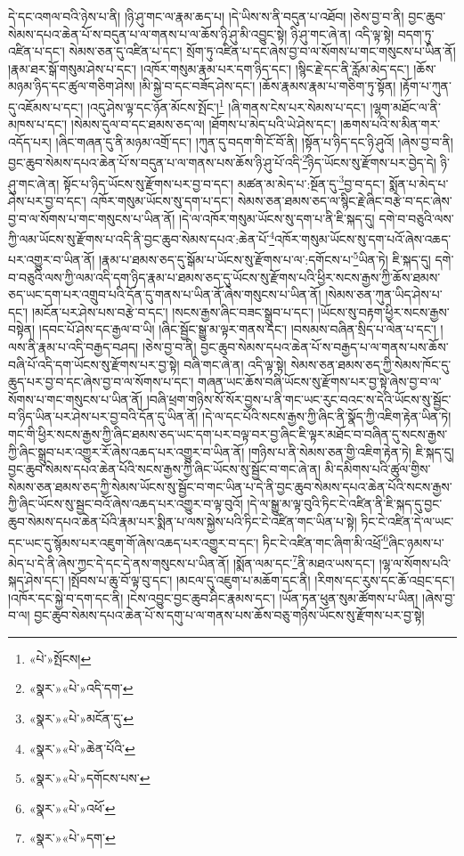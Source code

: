 དེ་དང་འགལ་བའི་ཉེས་པ་ནི། །ཉི་ཤུ་གང་ལ་རྣམ་ཆད་པ། །དེ་ཡིས་ས་ནི་བདུན་པ་འཐོབ། །ཅེས་བྱ་བ་ནི། བྱང་ཆུབ་སེམས་དཔའ་ཆེན་པོ་ས་བདུན་པ་ལ་གནས་པ་ལ་ཆོས་ཉི་ཤུ་མི་འབྱུང་སྟེ། ཉི་ཤུ་གང་ཞེ་ན། འདི་ལྟ་སྟེ། བདག་ཏུ་འཛིན་པ་དང་། སེམས་ཅན་དུ་འཛིན་པ་དང་། སྲོག་ཏུ་འཛིན་པ་དང་ཞེས་བྱ་བ་ལ་སོགས་པ་གང་གསུངས་པ་ཡིན་ནོ། །རྣམ་ཐར་སྒོ་གསུམ་ཤེས་པ་དང་། །འཁོར་གསུམ་རྣམ་པར་དག་ཉིད་དང་། །སྙིང་རྗེ་དང་ནི་རློམ་མེད་དང་། །ཆོས་མཉམ་ཉིད་དང་ཚུལ་གཅིག་ཤེས། །མི་སྐྱེ་བ་དང་བཟོད་ཤེས་དང་། །ཆོས་རྣམས་རྣམ་པ་གཅིག་ཏུ་སྟོན། །རྟོག་པ་ཀུན་དུ་འཇོམས་པ་དང་། །འདུ་ཤེས་ལྟ་དང་ཉོན་མོངས་སྤོང་།\footnote{«པེ་»སྤོངས།} །ཞི་གནས་ངེས་པར་སེམས་པ་དང་། །ལྷག་མཐོང་ལ་ནི་མཁས་པ་དང་། །སེམས་དུལ་བ་དང་ཐམས་ཅད་ལ། །ཐོགས་པ་མེད་པའི་ཡེ་ཤེས་དང་། །ཆགས་པའི་ས་མིན་གར་འདོད་པར། །ཞིང་གཞན་དུ་ནི་མཉམ་འགྲོ་དང་། །ཀུན་དུ་བདག་གི་ངོ་བོ་ནི། །སྟོན་པ་ཉིད་དང་ཉི་ཤུའོ། །ཞེས་བྱ་བ་ནི། བྱང་ཆུབ་སེམས་དཔའ་ཆེན་པོ་ས་བདུན་པ་ལ་གནས་པས་ཆོས་ཉི་ཤུ་པོ་འདི་\footnote{«སྣར་»«པེ་»འདི་དག་}ཉིད་ཡོངས་སུ་རྫོགས་པར་བྱེད་དེ། ཉི་ཤུ་གང་ཞེ་ན། སྟོང་པ་ཉིད་ཡོངས་སུ་རྫོགས་པར་བྱ་བ་དང་། མཚན་མ་མེད་པ་:སྔོན་དུ་\footnote{«སྣར་»«པེ་»མངོན་དུ་}བྱ་བ་དང་། སྨོན་པ་མེད་པ་ཤེས་པར་བྱ་བ་དང་། འཁོར་གསུམ་ཡོངས་སུ་དག་པ་དང་། སེམས་ཅན་ཐམས་ཅད་ལ་སྙིང་རྗེ་ཞིང་བརྩེ་བ་དང་ཞེས་བྱ་བ་ལ་སོགས་པ་གང་གསུངས་པ་ཡིན་ནོ། །དེ་ལ་འཁོར་གསུམ་ཡོངས་སུ་དག་པ་ནི་ཇི་སྐད་དུ། དགེ་བ་བཅུའི་ལས་ཀྱི་ལམ་ཡོངས་སུ་རྫོགས་པ་འདི་ནི་བྱང་ཆུབ་སེམས་དཔའ་:ཆེན་པོ་\footnote{«སྣར་»«པེ་»ཆེན་པོའི་}འཁོར་གསུམ་ཡོངས་སུ་དག་པའོ་ཞེས་འཆད་པར་འགྱུར་བ་ཡིན་ནོ། །རྣམ་པ་ཐམས་ཅད་དུ་སྒོམ་པ་ཡོངས་སུ་རྫོགས་པ་ལ་:དགོངས་པ་\footnote{«སྣར་»«པེ་»དགོངས་པས་}ཡིན་ཏེ། ཇི་སྐད་དུ། དགེ་བ་བཅུའི་ལས་ཀྱི་ལམ་འདི་དག་ཉིད་རྣམ་པ་ཐམས་ཅད་དུ་ཡོངས་སུ་རྫོགས་པའི་ཕྱིར་སངས་རྒྱས་ཀྱི་ཆོས་ཐམས་ཅད་ཡང་དག་པར་འགྲུབ་པའི་དོན་དུ་གནས་པ་ཡིན་ནོ་ཞེས་གསུངས་པ་ཡིན་ནོ། །སེམས་ཅན་ཀུན་ཡིད་ཤེས་པ་དང་། །མངོན་པར་ཤེས་པས་བརྩེ་བ་དང་། །སངས་རྒྱས་ཞིང་བཟང་སྒྲུབ་པ་དང་། །ཡོངས་སུ་བརྟག་ཕྱིར་སངས་རྒྱས་བསྟེན། །དབང་པོ་ཤེས་དང་རྒྱལ་བ་ཡི། །ཞིང་སྦྱོང་སྒྱུ་མ་ལྟར་གནས་དང་། །བསམས་བཞིན་སྲིད་པ་ལེན་པ་དང་། །ལས་ནི་རྣམ་པ་འདི་བརྒྱད་བཤད། །ཅེས་བྱ་བ་ནི། བྱང་ཆུབ་སེམས་དཔའ་ཆེན་པོ་ས་བརྒྱད་པ་ལ་གནས་པས་ཆོས་བཞི་པོ་འདི་དག་ཡོངས་སུ་རྫོགས་པར་བྱ་སྟེ། བཞི་གང་ཞེ་ན། འདི་ལྟ་སྟེ། སེམས་ཅན་ཐམས་ཅད་ཀྱི་སེམས་ཁོང་དུ་ཆུད་པར་བྱ་བ་དང་ཞེས་བྱ་བ་ལ་སོགས་པ་དང་། གཞན་ཡང་ཆོས་བཞི་ཡོངས་སུ་རྫོགས་པར་བྱ་སྟེ་ཞེས་བྱ་བ་ལ་སོགས་པ་གང་གསུངས་པ་ཡིན་ནོ། །བཞི་ཕྲག་གཉིས་སོ་སོར་བྱས་པ་ནི་གང་ཡང་རུང་བའང་ས་དེའི་ཡོངས་སུ་སྦྱོང་བ་ཉིད་ཡིན་པར་ཤེས་པར་བྱ་བའི་དོན་དུ་ཡིན་ནོ། །དེ་ལ་དང་པོའི་སངས་རྒྱས་ཀྱི་ཞིང་ནི་སྣོད་ཀྱི་འཇིག་རྟེན་ཡིན་ཏེ། གང་གི་ཕྱིར་སངས་རྒྱས་ཀྱི་ཞིང་ཐམས་ཅད་ཡང་དག་པར་བལྟ་བར་བྱ་ཞིང་ཇི་ལྟར་མཐོང་བ་བཞིན་དུ་སངས་རྒྱས་ཀྱི་ཞིང་སྒྲུབ་པར་འགྱུར་རོ་ཞེས་འཆད་པར་འགྱུར་བ་ཡིན་ནོ། །གཉིས་པ་ནི་སེམས་ཅན་གྱི་འཇིག་རྟེན་ཏེ། ཇི་སྐད་དུ། བྱང་ཆུབ་སེམས་དཔའ་ཆེན་པོའི་སངས་རྒྱས་ཀྱི་ཞིང་ཡོངས་སུ་སྦྱོང་བ་གང་ཞེ་ན། མི་དམིགས་པའི་ཚུལ་གྱིས་སེམས་ཅན་ཐམས་ཅད་ཀྱི་སེམས་ཡོངས་སུ་སྦྱོང་བ་གང་ཡིན་པ་དེ་ནི་བྱང་ཆུབ་སེམས་དཔའ་ཆེན་པོའི་སངས་རྒྱས་ཀྱི་ཞིང་ཡོངས་སུ་སྦྱང་བའོ་ཞེས་འཆད་པར་འགྱུར་བ་ལྟ་བུའོ། །དེ་ལ་སྒྱུ་མ་ལྟ་བུའི་ཏིང་ངེ་འཛིན་ནི་ཇི་སྐད་དུ་བྱང་ཆུབ་སེམས་དཔའ་ཆེན་པོའི་རྣམ་པར་སྨིན་པ་ལས་སྐྱེས་པའི་ཏིང་ངེ་འཛིན་གང་ཡིན་པ་སྟེ། ཏིང་ངེ་འཛིན་དེ་ལ་ཡང་དང་ཡང་དུ་སྙོམས་པར་འཇུག་གོ་ཞེས་འཆད་པར་འགྱུར་བ་དང་། ཏིང་ངེ་འཛིན་གང་ཞིག་མི་འཕྲོ་\footnote{«སྣར་»«པེ་»འཕོ་}ཞིང་ཉམས་པ་མེད་པ་དེ་ནི་ཞེས་ཀྱང་དེ་དང་དེ་ནས་གསུངས་པ་ཡིན་ནོ། །སྨོན་ལམ་དང་\footnote{«སྣར་»«པེ་»དག་}ནི་མཐའ་ཡས་དང་། །ལྷ་ལ་སོགས་པའི་སྐད་ཤེས་དང་། །སྤོབས་པ་ཆུ་བོ་ལྟ་བུ་དང་། །མངལ་དུ་འཇུག་པ་མཆོག་དང་ནི། །རིགས་དང་རུས་དང་ཆོ་འབྲང་དང་། །འཁོར་དང་སྐྱེ་བ་དག་དང་ནི། །ངེས་འབྱུང་བྱང་ཆུབ་ཤིང་རྣམས་དང་། །ཡོན་ཏན་ཕུན་སུམ་ཚོགས་པ་ཡིན། །ཞེས་བྱ་བ་ལ། བྱང་ཆུབ་སེམས་དཔའ་ཆེན་པོ་ས་དགུ་པ་ལ་གནས་པས་ཆོས་བཅུ་གཉིས་ཡོངས་སུ་རྫོགས་པར་བྱ་སྟེ། 